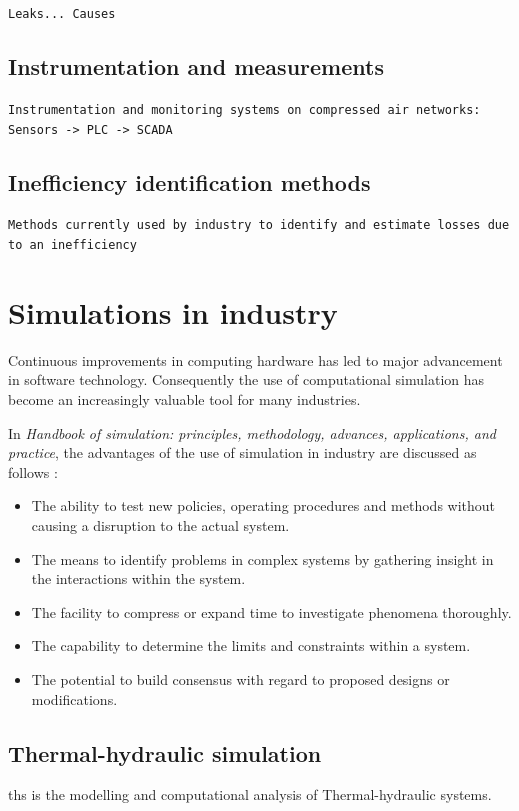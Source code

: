 	\texttt{Leaks... Causes}
	\subsection{Instrumentation and measurements}
	\texttt{Instrumentation and monitoring systems on compressed air networks: Sensors -> PLC -> SCADA}
	\subsection{Inefficiency identification methods}
	\texttt{Methods currently used by industry to identify and estimate losses due to an inefficiency}
	
	
\section{Simulations in industry}

Continuous improvements in computing hardware has led to major advancement in software technology. Consequently the use of computational simulation has become an increasingly valuable tool for many industries.\cite{kocsis2003integration} \par 

 In \textit{ Handbook of simulation: principles, methodology, advances, applications, and practice}, the advantages of the use of simulation in industry are discussed as follows \cite{banks1998handbook}: 
\begin{itemize}
	\item The ability to test new policies, operating procedures and methods without causing a disruption to the actual system.
	\item The means to identify problems in complex systems by gathering insight in the interactions within the system.
	\item The facility to compress or expand time to investigate phenomena thoroughly.
	\item The capability to determine the limits and constraints within a system.
	\item The potential to build consensus with regard to proposed designs or modifications.
\end{itemize}

\subsection{Thermal-hydraulic simulation}
\gls{ths} is the modelling and computational analysis of Thermal-hydraulic systems.
